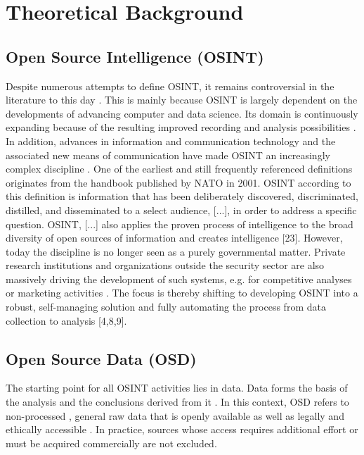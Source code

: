 \documentclass[10pt]{article}
\begin{document}
\section{Theoretical Background}

\subsection{Open Source Intelligence (OSINT)}

Despite numerous attempts to define OSINT, it remains controversial in the literature to
this day \cite{Williams.2018}. This is mainly because OSINT is largely dependent on the
developments of advancing computer and data science. Its domain is continuously expanding
because of the resulting improved recording and analysis possibilities \cite{AlKilani.2021, Ghioni.2023, Williams.2018}.
In addition, advances in information and communication technology and the associated new
means of communication have made OSINT an increasingly complex discipline
\cite{AlKilani.2021, Benes.2013, Chen.2012, Williams.2018}. One of the earliest and still
frequently referenced definitions \cite{DosPassos.2017} originates from the handbook
published by NATO in 2001. OSINT according to this definition is information that has been
deliberately discovered, discriminated, distilled, and disseminated to a select audience,
[...], in order to address a specific question. OSINT, [...] also applies the proven
process of intelligence to the broad diversity of open sources of information and creates
intelligence [23]. However, today the discipline is no longer seen as a purely governmental
matter. Private research institutions and organizations outside the security sector
\cite{Bohm.2021,Mercado.2005} are also massively driving the development of such systems,
e.g. for competitive analyses or marketing activities
\cite{AlKilani.2021, Dokman.2020,Ghioni.2023}. The focus is thereby shifting to
developing OSINT into a robust, self-managing solution and fully automating the process
from data collection to analysis [4,8,9].

\subsection{Open Source Data (OSD)}

The starting point for all OSINT activities lies in data. Data forms the basis of the
analysis and the conclusions derived from it \cite{Gibson.2016}. In this context, OSD
refers to non-processed \cite{DosPassos.2017}, general raw data that is openly available
\cite{Burke.2007} as well as legally and ethically accessible
\cite{Schaurer.2010, NorthAtlanticTreatyOrganization.2001}. In practice, sources whose
access requires additional effort \cite{Bohm.2021} or must be acquired commercially
\cite{Williams.2018,NorthAtlanticTreatyOrganization.2001,JointChiefsofStaffU.S.Army.2013}
are not excluded.
\end{document}
